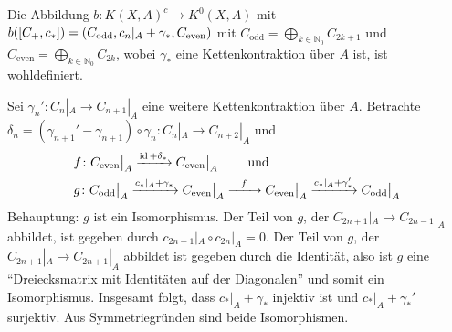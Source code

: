 \begin{lemma}[label=sub:lemma_3_1_4]
Die Abbildung $b \colon K(X,A)^c \to K^0(X,A)$ mit $b([C_+,c_*]) = \enbrace*{C_{\mathrm{odd}}, c_n|_A + \gamma_*, C_{\mathrm{even}}}$ mit 
$C_{\mathrm{odd}} = \bigoplus_{k \in \mathds{N}_0} C_{2k+1}$ und $C_{\mathrm{even}} = \bigoplus_{k \in \mathds{N}_0} C_{2k}$, wobei $\gamma_*$ eine Kettenkontraktion über 
$A$ ist, ist wohldefiniert.	
\end{lemma}
\begin{beweis}
Sei $\gamma_n' \colon C_n|_A \to C_{n+1}|_A$ eine weitere Kettenkontraktion über $A$. Betrachte 
$\delta_n = (\gamma_{n+1}' - \gamma_{n+1}) \circ \gamma_n \colon C_n|_A \to C_{n+2}|_A$ und
\begin{align*}
	&f \colon C_{\mathrm{even}}\big|_A \xrightarrow{\id + \delta_*} C_{\mathrm{even}}\big|_A \qquad  \text{ und} \\
	& g  \colon C_{\mathrm{odd}}\big|_A \xrightarrow{c_*|_A + \gamma_*} C_{\mathrm{even}}\big|_A \xrightarrow{\minwidthbox{f}{2em}} C_{\mathrm{even}}\big|_A \xrightarrow{c_*|_A + \gamma_*'}
	C_{\mathrm{odd}}\big|_A    
\end{align*}
Behauptung: $g$ ist ein Isomorphismus.
Der Teil von $g$, der $C_{2n+1}|_A \to C_{2n-1}|_A$ abbildet, ist gegeben durch $c_{2n+1}|_A \circ c_{2n}|_A=0$. Der Teil von $g$, der $C_{2n+1}|_A \to C_{2n+1}|_A$ abbildet 
ist gegeben durch die Identität, also ist $g$ eine \enquote{Dreiecksmatrix mit Identitäten auf der Diagonalen} und somit ein Isomorphismus. Insgesamt folgt, dass
$c_*|_A + \gamma_*$ injektiv ist und $c_*|_A + \gamma_*'$ surjektiv. Aus Symmetriegründen sind beide Isomorphismen.


\end{beweis}
